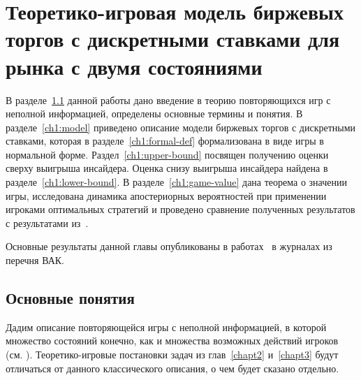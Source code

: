 \chapter{Теоретико-игровая модель биржевых торгов с дискретными ставками для рынка с
  двумя состояниями} \label{chapt1} 
{
\newcommand{\generalGame}[2]{G_{#1}^m\left({#2}\right)}
\newcommand{\infiniteGame}[1]{G_{\infty}^m\left({#1}\right)}
\newcommand{\firstPlayerPayoff}[4]{K_{#1}^m\left({#2}, {#3}, {#4}\right)}
\newcommand{\infiniteFirstPlayerPayoff}[3]{K_{\infty}^m\left({#1}, {#2}, {#3}\right)}
\newcommand{\gameValue}[2]{V_{#1}^m\left({#2}\right)}
\newcommand{\infiniteGameValue}[1]{V_{\infty}^m\left({#1}\right)}
\newcommand{\symm}[1]{\overline{#1}}
\newcommand{\symmGameExpression}[2][\infty]{G_{#1}^{m, \DCo}\left({#2}\right)}
\newcommand{\upperBound}[1]{H_{\infty}^m\left({#1}\right)}
\newcommand{\fGeneral}[2][1]{\sigma_{#1}^{#2}}
\newcommand{\pEven}[1][k]{p^0_{#1}}
\newcommand{\pOdd}[1][k]{p^{\beta}_{#1}}
\newcommand{\fEven}[1][k]{\phi^0_{#1}}
\newcommand{\fOdd}[1][k]{\phi^{\beta}_{#1}}
\newcommand{\fOpt}{\sigma^*}
\newcommand{\lowerBound}[2][\infty]{L_{#1}^m\left({#2}\right)}

В разделе~\ref{ch1:intro} данной работы дано введение в теорию повторяющихся игр с неполной информацией, определены основные термины и понятия.
В разделе~\ref{ch1:model} приведено описание модели биржевых торгов с дискретными ставками, которая в разделе~\ref{ch1:formal-def} формализована в виде игры в нормальной форме.
Раздел~\ref{ch1:upper-bound} посвящен получению оценки сверху выигрыша инсайдера.
Оценка снизу выигрыша инсайдера найдена в разделе~\ref{ch1:lower-bound}.
В разделе~\ref{ch1:game-value} дана теорема о значении игры, исследована динамика апостериорных вероятностей при применении игроками оптимальных стратегий и проведено сравнение полученных результатов с результатами из~\cite{domansky07}.

Основные результаты данной главы опубликованы в работах~\cite{pyanykh14,pyanykh16:discr:ru} в журналах из перечня ВАК.

\section{Основные понятия}\label{ch1:intro}
Дадим описание повторяющейся игры с неполной информацией, в которой множество состояний конечно, как и множества возможных действий игроков (см. \cite{aumann95}). 
Теоретико-игровые постановки задач из глав~\ref{chapt2} и~\ref{chapt3} будут отличаться от данного классического описания, о чем будет сказано отдельно.

}
